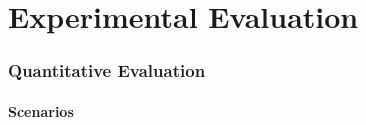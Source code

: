 \section{Experimental Evaluation}

\begin{frame}
	\frametitle{Quantitative Evaluation}
	\framesubtitle{Scenarios}
	
	
\end{frame}
